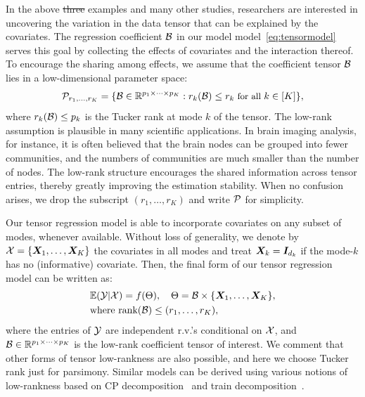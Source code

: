 \documentclass{article}
\theoremstyle{plain}
\theoremstyle{definition}
\providecommand{\DIFaddtex}[1]{{\protect\color{blue}\uwave{#1}}} %
\providecommand{\DIFdeltex}[1]{{\protect\color{red}\sout{#1}}}                      %
\providecommand{\DIFadd}[1]{{\DIFaddtex{#1}}} %
\providecommand{\DIFdel}[1]{{\DIFdeltex{#1}}} %
\begin{document}
In the above \DIFdel{three} \DIFadd{two} examples and many other studies, researchers are interested in uncovering the variation in the data tensor that can be explained by the covariates. The regression coefficient $\mathcal{B}$ in our model model~\eqref{eq:tensormodel} serves this goal by collecting the effects of covariates and the interaction thereof.  
To encourage the sharing among effects, we assume that the coefficient tensor $\mathcal{B}$ lies in a low-dimensional parameter space:
\begin{equation}\label{eq:rank}
\small \tP_{r_1,\ldots,r_K}=\{\tB\in\mathbb{R}^{p_1\times \cdots \times p_K}: r_k(\tB)\leq r_k \text{ for all } k\in[K]\},
\end{equation}
where $r_k(\mathcal{B})\leq p_k$ is the Tucker rank at mode $k$ of the tensor. The low-rank assumption is plausible in many scientific applications. In brain imaging analysis, for instance, it is often believed that the brain nodes can be grouped into fewer communities, and the numbers of communities are much smaller than the number of nodes. The low-rank structure encourages the shared information across tensor entries, thereby greatly improving the estimation stability. When no confusion arises, we drop the subscript $(r_1,\ldots,r_K)$ and write $\mathcal{P}$ for simplicity.


Our tensor regression model is able to incorporate covariates on any subset of modes, whenever available. Without loss of generality, we denote by $\mathcal{X}=\{\bm X_1,\ldots,\bm X_K\}$ the covariates in all modes and treat $\bm X_k=\bm I_{d_k}$ if the mode-$k$ has no (informative) covariate. Then, the final form of our tensor regression model can be written as:
\begin{align}\label{eq:tensormodel2}
&\mathbb{E}(\mathcal{Y}|\mathcal{X})=f(\Theta),\quad \Theta =\mathcal{B}\times\{\bm X_1,\ldots,\bm X_K\},\notag\\
&\text{where}\ \text{rank}(\mathcal{B})\leq (r_1,\ldots,r_K),
\end{align}
where the entries of $\mathcal{Y}$ are independent r.v.'s conditional on $\mathcal{X}$, and $\mathcal{B}\in\mathbb{R}^{p_1\times \cdots\times p_K}$ is the low-rank coefficient tensor of interest. We comment that other forms of tensor low-rankness are also possible, and here we choose Tucker rank just for parsimony. Similar models can be derived using various notions of low-rankness based on CP decomposition~\cite{hitchcock1927expression} and train decomposition~\cite{oseledets2011tensor}. 
\vspace{-.2cm}
\end{document}
